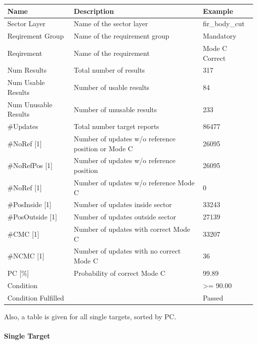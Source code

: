 \begin{center}
 \begin{table}[H]
  \begin{tabularx}{\textwidth}{ | l | X |  l | }
    \hline
    \textbf{Name} & \textbf{Description} & \textbf{Example} \\ \hline
    Sector Layer & Name of the sector layer & fir\_body\_cut \\ \hline
    Reqirement Group & Name of the requirement group & Mandatory \\ \hline
    Reqirement & Name of the requirement & Mode C Correct \\ \hline
    Num Results & Total number of results & 317 \\ \hline
    Num Usable Results & Number of usable results & 84 \\ \hline
    Num Unusable Results & Number of unusable results & 233 \\ \hline
    \#Updates & Total number target reports & 86477 \\ \hline
    \#NoRef [1] & Number of updates w/o reference position or Mode C & 26095 \\ \hline
    \#NoRefPos [1] & Number of updates w/o reference position  & 26095 \\ \hline
    \#NoRef [1] & Number of updates w/o reference Mode C & 0 \\ \hline
    \#PosInside [1] & Number of updates inside sector & 33243 \\ \hline
    \#PosOutside [1] & Number of updates outside sector & 27139 \\ \hline
    \#CMC [1] & Number of updates with correct Mode C & 33207 \\ \hline
    \#NCMC [1] & Number of updates with no correct Mode C & 36 \\ \hline
    PC [\%] & Probability of correct Mode C & 99.89 \\ \hline
    Condition &  & >= 90.00 \\ \hline
    Condition Fulfilled &  & Passed \\ \hline
\end{tabularx}
\end{table}
\end{center}

Also, a table is given for all single targets, sorted by PC.

\paragraph{Single Target}


